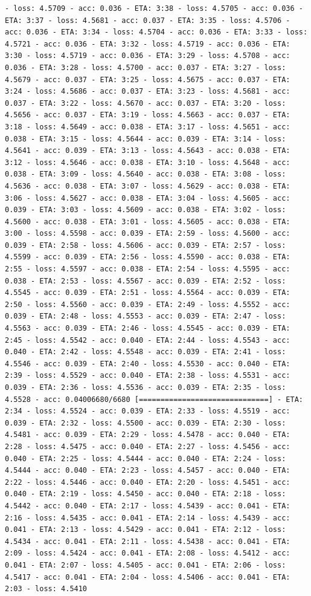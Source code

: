 \documentclass[11pt]{article}
\begin{document}
\begin{Verbatim}[commandchars=\\\{\}]
- loss: 4.5709 - acc: 0.036 - ETA: 3:38 - loss: 4.5705 - acc: 0.036 - ETA: 3:37 - loss: 4.5681 - acc: 0.037 - ETA: 3:35 - loss: 4.5706 - acc: 0.036 - ETA: 3:34 - loss: 4.5704 - acc: 0.036 - ETA: 3:33 - loss: 4.5721 - acc: 0.036 - ETA: 3:32 - loss: 4.5719 - acc: 0.036 - ETA: 3:30 - loss: 4.5719 - acc: 0.036 - ETA: 3:29 - loss: 4.5708 - acc: 0.036 - ETA: 3:28 - loss: 4.5700 - acc: 0.037 - ETA: 3:27 - loss: 4.5679 - acc: 0.037 - ETA: 3:25 - loss: 4.5675 - acc: 0.037 - ETA: 3:24 - loss: 4.5686 - acc: 0.037 - ETA: 3:23 - loss: 4.5681 - acc: 0.037 - ETA: 3:22 - loss: 4.5670 - acc: 0.037 - ETA: 3:20 - loss: 4.5656 - acc: 0.037 - ETA: 3:19 - loss: 4.5663 - acc: 0.037 - ETA: 3:18 - loss: 4.5649 - acc: 0.038 - ETA: 3:17 - loss: 4.5651 - acc: 0.038 - ETA: 3:15 - loss: 4.5644 - acc: 0.039 - ETA: 3:14 - loss: 4.5641 - acc: 0.039 - ETA: 3:13 - loss: 4.5643 - acc: 0.038 - ETA: 3:12 - loss: 4.5646 - acc: 0.038 - ETA: 3:10 - loss: 4.5648 - acc: 0.038 - ETA: 3:09 - loss: 4.5640 - acc: 0.038 - ETA: 3:08 - loss: 4.5636 - acc: 0.038 - ETA: 3:07 - loss: 4.5629 - acc: 0.038 - ETA: 3:06 - loss: 4.5627 - acc: 0.038 - ETA: 3:04 - loss: 4.5605 - acc: 0.039 - ETA: 3:03 - loss: 4.5609 - acc: 0.038 - ETA: 3:02 - loss: 4.5600 - acc: 0.038 - ETA: 3:01 - loss: 4.5605 - acc: 0.038 - ETA: 3:00 - loss: 4.5598 - acc: 0.039 - ETA: 2:59 - loss: 4.5600 - acc: 0.039 - ETA: 2:58 - loss: 4.5606 - acc: 0.039 - ETA: 2:57 - loss: 4.5599 - acc: 0.039 - ETA: 2:56 - loss: 4.5590 - acc: 0.038 - ETA: 2:55 - loss: 4.5597 - acc: 0.038 - ETA: 2:54 - loss: 4.5595 - acc: 0.038 - ETA: 2:53 - loss: 4.5567 - acc: 0.039 - ETA: 2:52 - loss: 4.5545 - acc: 0.039 - ETA: 2:51 - loss: 4.5564 - acc: 0.039 - ETA: 2:50 - loss: 4.5560 - acc: 0.039 - ETA: 2:49 - loss: 4.5552 - acc: 0.039 - ETA: 2:48 - loss: 4.5553 - acc: 0.039 - ETA: 2:47 - loss: 4.5563 - acc: 0.039 - ETA: 2:46 - loss: 4.5545 - acc: 0.039 - ETA: 2:45 - loss: 4.5542 - acc: 0.040 - ETA: 2:44 - loss: 4.5543 - acc: 0.040 - ETA: 2:42 - loss: 4.5548 - acc: 0.039 - ETA: 2:41 - loss: 4.5546 - acc: 0.039 - ETA: 2:40 - loss: 4.5530 - acc: 0.040 - ETA: 2:39 - loss: 4.5529 - acc: 0.040 - ETA: 2:38 - loss: 4.5531 - acc: 0.039 - ETA: 2:36 - loss: 4.5536 - acc: 0.039 - ETA: 2:35 - loss: 4.5528 - acc: 0.04006680/6680 [==============================] - ETA: 2:34 - loss: 4.5524 - acc: 0.039 - ETA: 2:33 - loss: 4.5519 - acc: 0.039 - ETA: 2:32 - loss: 4.5500 - acc: 0.039 - ETA: 2:30 - loss: 4.5481 - acc: 0.039 - ETA: 2:29 - loss: 4.5478 - acc: 0.040 - ETA: 2:28 - loss: 4.5475 - acc: 0.040 - ETA: 2:27 - loss: 4.5456 - acc: 0.040 - ETA: 2:25 - loss: 4.5444 - acc: 0.040 - ETA: 2:24 - loss: 4.5444 - acc: 0.040 - ETA: 2:23 - loss: 4.5457 - acc: 0.040 - ETA: 2:22 - loss: 4.5446 - acc: 0.040 - ETA: 2:20 - loss: 4.5451 - acc: 0.040 - ETA: 2:19 - loss: 4.5450 - acc: 0.040 - ETA: 2:18 - loss: 4.5442 - acc: 0.040 - ETA: 2:17 - loss: 4.5439 - acc: 0.041 - ETA: 2:16 - loss: 4.5435 - acc: 0.041 - ETA: 2:14 - loss: 4.5439 - acc: 0.041 - ETA: 2:13 - loss: 4.5429 - acc: 0.041 - ETA: 2:12 - loss: 4.5434 - acc: 0.041 - ETA: 2:11 - loss: 4.5438 - acc: 0.041 - ETA: 2:09 - loss: 4.5424 - acc: 0.041 - ETA: 2:08 - loss: 4.5412 - acc: 0.041 - ETA: 2:07 - loss: 4.5405 - acc: 0.041 - ETA: 2:06 - loss: 4.5417 - acc: 0.041 - ETA: 2:04 - loss: 4.5406 - acc: 0.041 - ETA: 2:03 - loss: 4.5410 
\end{Verbatim}
\end{document}
